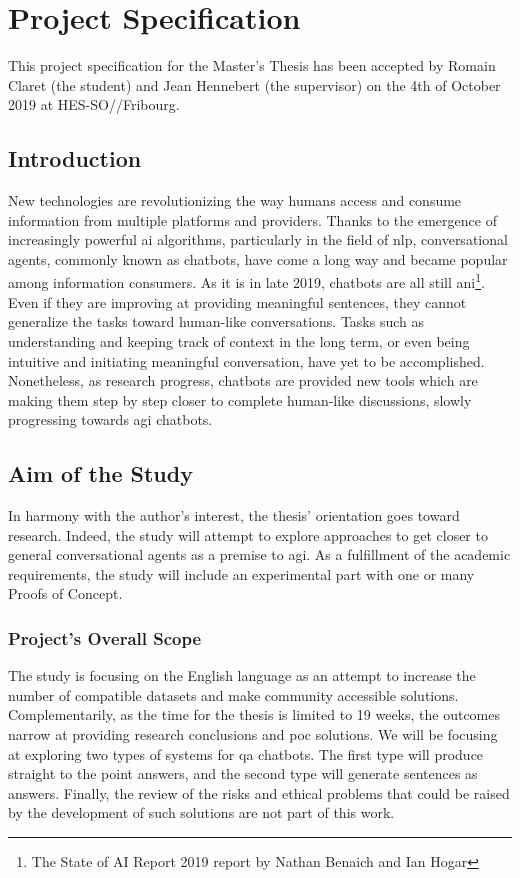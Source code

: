 \chapter*{Project Specification}
This project specification for the Master's Thesis has been accepted by Romain Claret (the student) and Jean Hennebert (the supervisor) on the 4th of October 2019 at HES-SO//Fribourg.

\section*{Introduction}
New technologies are revolutionizing the way humans access and consume information from multiple platforms and providers. Thanks to the emergence of increasingly powerful \gls{ai} algorithms, particularly in the field of \gls{nlp}, conversational agents, commonly known as chatbots, have come a long way and became popular among information consumers. As it is in late 2019, chatbots are all still \gls{ani}\footnote{The State of AI Report 2019 report by Nathan Benaich and Ian Hogar\cite{studies:state_of_ai_2019}}. Even if they are improving at providing meaningful sentences, they cannot generalize the tasks toward human-like conversations. Tasks such as understanding and keeping track of context in the long term, or even being intuitive and initiating meaningful conversation, have yet to be accomplished. Nonetheless, as research progress, chatbots are provided new tools which are making them step by step closer to complete human-like discussions, slowly progressing towards \gls{agi} chatbots.


\section*{Aim of the Study}
In harmony with the author's interest, the thesis' orientation goes toward research. Indeed, the study will attempt to explore approaches to get closer to general conversational agents as a premise to \gls{agi}. As a fulfillment of the academic requirements, the study will include an experimental part with one or many Proofs of Concept.

\subsection*{Project's Overall Scope}
The study is focusing on the English language as an attempt to increase the number of compatible datasets and make community accessible solutions. Complementarily, as the time for the thesis is limited to 19 weeks, the outcomes narrow at providing research conclusions and \gls{poc} solutions. We will be focusing at exploring two types of systems for \gls{qa} chatbots. The first type will produce straight to the point answers, and the second type will generate sentences as answers. Finally, the review of the risks and ethical problems that could be raised by the development of such solutions are not part of this work.


